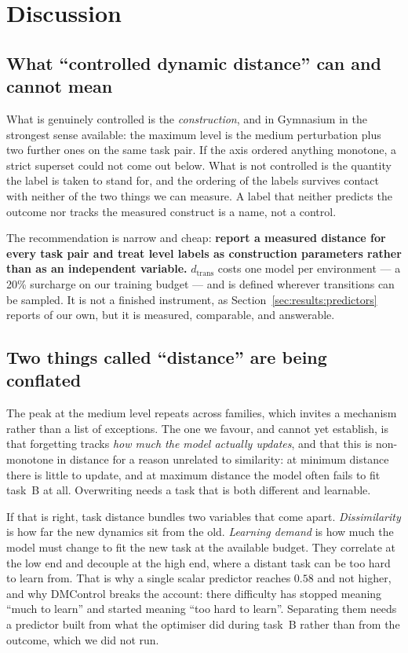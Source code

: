 \documentclass[11pt]{article}
\begin{document}
\section{Discussion}
\label{sec:discussion}

\subsection{What ``controlled dynamic distance'' can and cannot mean}

What is genuinely controlled is the \emph{construction}, and in Gymnasium in
the strongest sense available: the maximum level is the medium perturbation
plus two further ones on the same task pair. If the axis ordered anything
monotone, a strict superset could not come out below. What is not controlled is
the quantity the label is taken to stand for, and the ordering of the labels
survives contact with neither of the two things we can measure. A label that
neither predicts the outcome nor tracks the measured construct is a name, not a
control.

The recommendation is narrow and cheap: \textbf{report a measured distance for
every task pair and treat level labels as construction parameters rather than
as an independent variable.} $d_{\mathrm{trans}}$ costs one model per
environment --- a 20\% surcharge on our training budget --- and is defined
wherever transitions can be sampled. It is not a finished instrument, as
Section~\ref{sec:results:predictors} reports of our own, but it is measured,
comparable, and answerable.

\subsection{Two things called ``distance'' are being conflated}

The peak at the medium level repeats across families, which invites a mechanism
rather than a list of exceptions. The one we favour, and cannot yet establish,
is that forgetting tracks \emph{how much the model actually updates}, and that
this is non-monotone in distance for a reason unrelated to similarity: at
minimum distance there is little to update, and at maximum distance the model
often fails to fit task~B at all. Overwriting needs a task that is both
different and learnable.

If that is right, task distance bundles two variables that come apart.
\emph{Dissimilarity} is how far the new dynamics sit from the old.
\emph{Learning demand} is how much the model must change to fit the new task at
the available budget. They correlate at the low end and decouple at the high
end, where a distant task can be too hard to learn from. That is why a single
scalar predictor reaches $0.58$ and not higher, and why DMControl breaks the
account: there difficulty has stopped meaning ``much to learn'' and started
meaning ``too hard to learn''. Separating them needs a predictor built from
what the optimiser did during task~B rather than from the outcome, which we did
not run.
\end{document}
